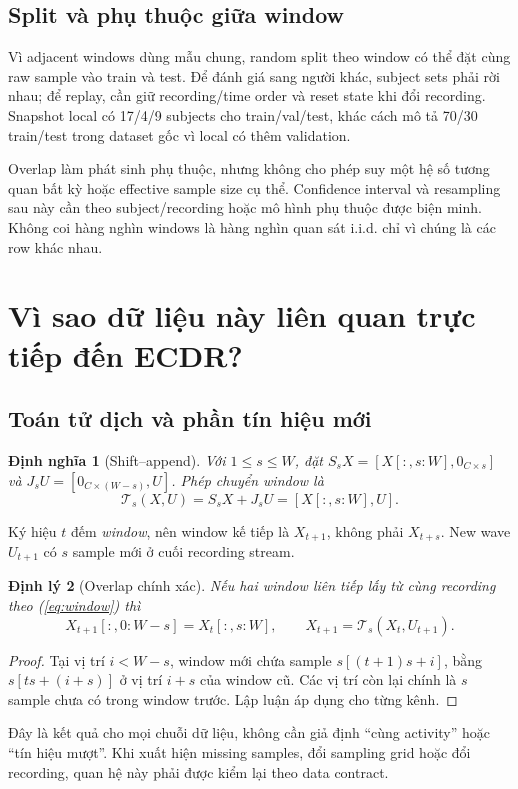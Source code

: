 \documentclass[11pt,a4paper]{article}
\newtheorem{definition}{Định nghĩa}[section]
\newtheorem{theorem}[definition]{Định lý}
\theoremstyle{remark}
\begin{document}
\subsection{Split và phụ thuộc giữa window}
Vì adjacent windows dùng mẫu chung, random split theo window có thể đặt
cùng raw sample vào train và test. Để đánh giá sang người khác, subject sets
phải rời nhau; để replay, cần giữ recording/time order và reset state khi
đổi recording. Snapshot local có 17/4/9 subjects cho train/val/test, khác
cách mô tả 70/30 train/test trong dataset gốc vì local có thêm validation.

Overlap làm phát sinh phụ thuộc, nhưng không cho phép suy một hệ số tương
quan bất kỳ hoặc effective sample size cụ thể. Confidence interval và
resampling sau này cần theo subject/recording hoặc mô hình phụ thuộc được
biện minh. Không coi hàng nghìn windows là hàng nghìn quan sát i.i.d. chỉ
vì chúng là các row khác nhau.

\section{Vì sao dữ liệu này liên quan trực tiếp đến ECDR?}
\subsection{Toán tử dịch và phần tín hiệu mới}
\begin{definition}[Shift--append]
Với $1\le s\le W$, đặt $S_sX=[X[:,s:W],0_{C\times s}]$ và
$J_sU=[0_{C\times(W-s)},U]$. Phép chuyển window là
\begin{equation}
 \mathcal T_s(X,U)=S_sX+J_sU=[X[:,s:W],U].
 \label{eq:transition}
\end{equation}
\end{definition}
Ký hiệu $t$ đếm \emph{window}, nên window kế tiếp là $X_{t+1}$, không phải
$X_{t+s}$. New wave $U_{t+1}$ có $s$ sample mới ở cuối recording stream.

\begin{theorem}[Overlap chính xác]\label{th:overlap}
Nếu hai window liên tiếp lấy từ cùng recording theo (\ref{eq:window}) thì
\begin{equation}
 X_{t+1}[:,0:W-s]=X_t[:,s:W],\qquad
 X_{t+1}=\mathcal T_s(X_t,U_{t+1}).
\end{equation}
\end{theorem}
\begin{proof}
Tại vị trí $i<W-s$, window mới chứa sample $s[(t+1)s+i]$, bằng
$s[ts+(i+s)]$ ở vị trí $i+s$ của window cũ. Các vị trí còn lại chính là
$s$ sample chưa có trong window trước. Lập luận áp dụng cho từng kênh.
\end{proof}
Đây là kết quả cho mọi chuỗi dữ liệu, không cần giả định ``cùng activity''
hoặc ``tín hiệu mượt''. Khi xuất hiện missing samples, đổi sampling grid
hoặc đổi recording, quan hệ này phải được kiểm lại theo data contract.
\end{document}
